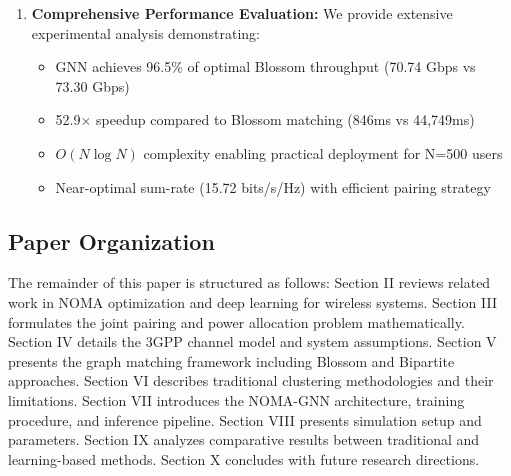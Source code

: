 \begin{enumerate}
    \item \textbf{Comprehensive Performance Evaluation:} We provide extensive experimental analysis demonstrating:
    \begin{itemize}
        \item GNN achieves 96.5\% of optimal Blossom throughput (70.74 Gbps vs 73.30 Gbps)
        \item 52.9× speedup compared to Blossom matching (846ms vs 44,749ms)
        \item $O(N \log N)$ complexity enabling practical deployment for N=500 users
        \item Near-optimal sum-rate (15.72 bits/s/Hz) with efficient pairing strategy
    \end{itemize}
\end{enumerate}

\subsection{Paper Organization}

The remainder of this paper is structured as follows: Section II reviews related work in NOMA optimization and deep learning for wireless systems. Section III formulates the joint pairing and power allocation problem mathematically. Section IV details the 3GPP channel model and system assumptions. Section V presents the graph matching framework including Blossom and Bipartite approaches. Section VI describes traditional clustering methodologies and their limitations. Section VII introduces the NOMA-GNN architecture, training procedure, and inference pipeline. Section VIII presents simulation setup and parameters. Section IX analyzes comparative results between traditional and learning-based methods. Section X concludes with future research directions.
